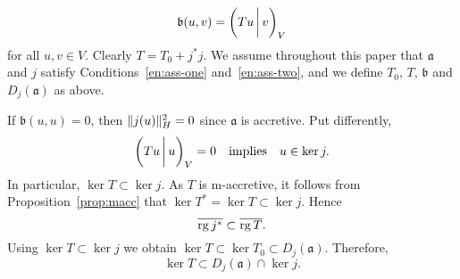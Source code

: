 \documentclass[a4paper,oneside,12pt]{amsart}
\theoremstyle{plain}
\theoremstyle{definition}
\DeclarePairedDelimiter\norm{\lVert}{\rVert}
\begin{document}
\begin{equation}\label{eq:def-T}
    {{\mathfrak{{b}}}}(u,v)={{\ifthenelse{\equal{auto}{auto}}{\left({Tu}\mkern3mu{\biggm|}\mkern3mu {v}\right)}{}
\ifthenelse{\equal{auto}{b}}{\bigl({Tu}\mkern3mu{\biggm|}\mkern3mu {v}\bigr)}{}
\ifthenelse{\equal{auto}{B}}{\Bigl({Tu}\mkern3mu{\bigm|}\mkern3mu {v}\Bigr)}{}
}}_V
\end{equation}
for all $u,v\in V$. Clearly $T=T_0+j^*j$.
We assume throughout this paper that ${{\mathfrak{{a}}}}$ and $j$ satisfy Conditions~\ref{en:ass-one} and~\ref{en:ass-two}, and we define $T_0$, $T$, ${{\mathfrak{{b}}}}$ and $D_j({{\mathfrak{{a}}}})$ as above.

If ${{\mathfrak{{b}}}}(u,u)=0$, then $\norm{j(u)}_H^2=0$ since ${{\mathfrak{{a}}}}$ is accretive. Put differently,
\begin{equation}\label{eq:ker-b}
    {{\ifthenelse{\equal{auto}{auto}}{\left({Tu}\mkern3mu{\biggm|}\mkern3mu {u}\right)}{}
\ifthenelse{\equal{auto}{b}}{\bigl({Tu}\mkern3mu{\biggm|}\mkern3mu {u}\bigr)}{}
\ifthenelse{\equal{auto}{B}}{\Bigl({Tu}\mkern3mu{\bigm|}\mkern3mu {u}\Bigr)}{}
}}_V=0\quad\text{implies}\quad u\in\ker j.
\end{equation}
In particular, $\ker T\subset\ker j$.
As $T$ is {\ensuremath{\text{m}}}-accretive, it follows from Proposition~\ref{prop:macc} that
$\ker T^*=\ker T\subset\ker j$. Hence
\begin{equation}\label{eq:jT-macc}
   {\overline{{\operatorname{rg} j^*\vphantom{T}}}}\subset{\overline{{\operatorname{rg} T}}}.
\end{equation}
Using $\ker T\subset\ker j$ we obtain $\ker T\subset\ker T_0\subset D_j({{\mathfrak{{a}}}})$. Therefore,
\begin{equation}\label{eq:kerT-triv}
	\ker T\subset D_j({{\mathfrak{{a}}}})\cap\ker j.
\end{equation}
\end{document}
